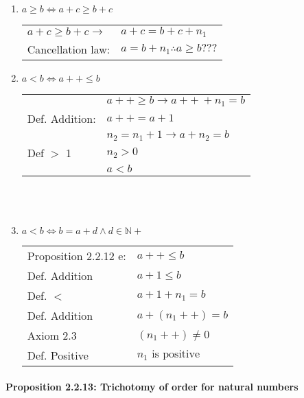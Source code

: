 \documentclass[letterpaper]{article}
\begin{document}
{\begin{enumerate}
		\item $a \geq b \iff a + c \geq b + c$
			\begin{center}
				\begin{tabular}{l l}
					$a + c \geq b + c \to$ & $a + c = b + c + n_1$ \\
					Cancellation law:      & $a = b + n_1 \therefore a \geq b ???$
				\end{tabular}
			\end{center} 
			
		\item $a < b \iff a++ \leq b$
			\begin{center}
				\begin{tabular}{l l}
                         & $a++ \geq b \to a++~ + n_1 = b$ \\
          Def. Addition: & $a++ = a + 1$ \\
          							 & $n_2 = n_1 + 1 \to a + n_2 = b$ \\
          Def $ > $ 1    & $n_2 > 0$ \\
          							 & $a < b$
				\end{tabular}
			\end{center}
			\\~\\

		\item $a < b \iff b = a + d \land d \in \mathbb{N}+$
			\begin{center}
				\begin{tabular}{l l}
					Proposition 2.2.12 e: & $a++ \leq b$ \\
					Def. Addition         & $a + 1 \leq b$ \\
					Def. $ < $            & $a + 1 + n_1 = b$ \\
					Def. Addition         & $a + (n_1++) = b$ \\
					Axiom 2.3             & $(n_1++) \neq 0$ \\
					Def. Positive         & $n_1 \text{ is positive}$
				\end{tabular}
			\end{center}
	\end{enumerate}
}

\paragraph{Proposition 2.2.13: Trichotomy of order for natural numbers}~
\end{document}
